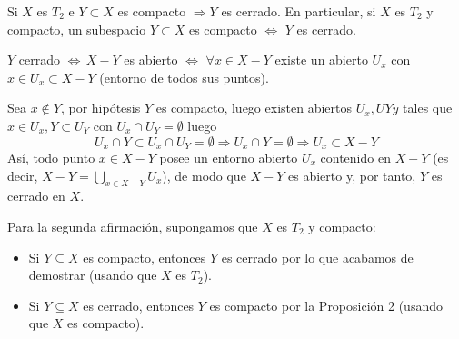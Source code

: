 \begin{cor}
Si $X$ es $T_2$ e $Y\subset X$ es compacto $\Rightarrow Y$ es cerrado. En particular, si $X$ es $T_2$ y compacto, un subespacio $Y\subset X$ es compacto $\iff$ $Y$ es cerrado. 
\end{cor}
\begin{dem}
    $Y$ cerrado $\iff \, X-Y$ es abierto $\iff$ $\forall x\in X-Y$ existe un abierto $U_x$ con $x\in U_x \subset X-Y$ (entorno de todos sus puntos). 
    
    Sea $x\nin Y$, por hip\'otesis $Y$ es compacto, luego existen abiertos $U_x, UYy$ tales que $x\in U_x, Y \subset U_Y$ con $U_x\cap U_Y =\emptyset$ luego
    $$U_x\cap Y \subset U_x\cap U_Y = \emptyset \Rightarrow U_x\cap Y = \emptyset \Rightarrow U_x \subset X-Y$$ Así, todo punto $x \in X - Y$ posee un entorno abierto $U_x$ contenido en $X - Y$ (es decir, $X - Y = \bigcup_{x \in X - Y} U_x$), de modo que $X - Y$ es abierto y, por tanto, $Y$ es cerrado en $X$.

    Para la segunda afirmación, supongamos que $X$ es $T_2$ y compacto:
    \begin{itemize}
        \item[$\Rightarrow)$] Si $Y \subseteq X$ es compacto, entonces $Y$ es cerrado por lo que acabamos de demostrar (usando que $X$ es $T_2$).
        \item[$\Leftarrow)$] Si $Y \subseteq X$ es cerrado, entonces $Y$ es compacto por la Proposición 2 (usando que $X$ es compacto). \qedhere
    \end{itemize}
\end{dem}
